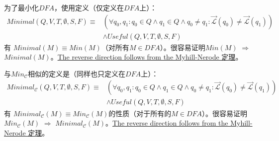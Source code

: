 \begin{property}\label{pro:aldef}
    为了最小化$DFA$，使用定义（仅定义在$DFA$上）：
    \begin{align*}
        Minimal(Q,V,T,\emptyset,S,F)  \equiv & ( \forall q_0,q_1:q_0 \in Q \land q_1 \in Q \land q_0 \not= q_1 : \overrightarrow{\mathcal{L}}(q_0) \not= \overrightarrow{\mathcal{L}}(q_1)  ) \\
                                     & \land Useful(Q,V,T,\emptyset,S,F)
        \end{align*}
有 $Minimal(M) \equiv Min(M)$（对所有$M\in DFA$）。很容易证明$Min(M)$ $\Rightarrow$ $Minimal(M)$。\uline{The reverse direction follows from the Myhill-Nerode 定理}。

与$Min_{\mathcal{C}}$相似的定义是（同样也只定义在$DFA$上）：
    \begin{align*}
        Minimal_{\mathcal{C}}(Q,V,T,\emptyset,S,F)  \equiv & ( \forall q_0,q_1:q_0 \in Q \land q_1 \in Q \land q_0 \not= q_1 : \overrightarrow{\mathcal{L}}(q_0) \not= \overrightarrow{\mathcal{L}}(q_1)  ) \\
                                 & \land Useful(Q,V,T,\emptyset,S,F)
    \end{align*}
有 $Minimal_{\mathcal{C}}(M) \equiv Min_{\mathcal{C}}(M)$的性质（对于所有的$M\in DFA$）。很容易证明$Min_{\mathcal{C}}(M)$ $\Rightarrow$ $Minimal_{\mathcal{C}}(M)$。\uline{The reverse direction follows from the Myhill-Nerode 定理}。
\end{property}


